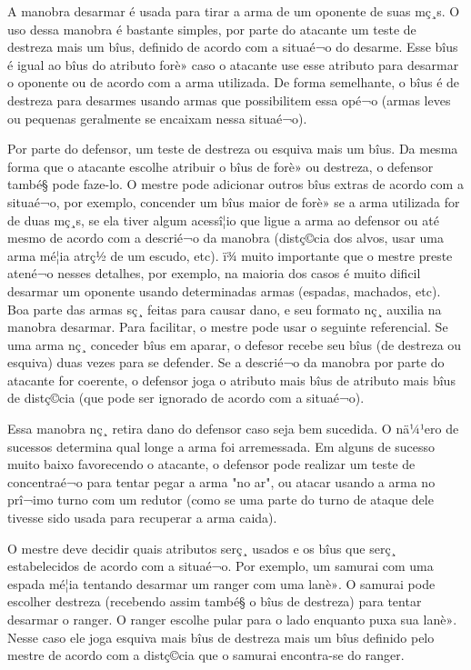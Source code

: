 A manobra desarmar é usada para tirar a arma de um oponente de suas mç¸s. O uso dessa manobra é bastante simples, por parte do atacante um teste de destreza mais um bîus, definido de acordo com a situaé¬o do desarme. Esse bîus é igual ao bîus do atributo forè» caso o atacante use esse atributo para desarmar o oponente ou de acordo com a arma utilizada. De forma semelhante, o bîus é de destreza para desarmes usando armas que possibilitem essa opé¬o (armas leves ou pequenas geralmente se encaixam nessa situaé¬o).

Por parte do defensor, um teste de destreza ou esquiva mais um bîus. Da mesma forma que o atacante escolhe atribuir o bîus de forè» ou destreza, o defensor també§ pode faze-lo. O mestre pode adicionar outros bîus extras de acordo com a situaé¬o, por exemplo, concender um bîus maior de forè» se a arma utilizada for de duas mç¸s, se ela tiver algum acessî¦io que ligue a arma ao defensor ou até mesmo de acordo com a descrié¬o da manobra (distç©cia dos alvos, usar uma arma mé¦ia atrç½ de um escudo, etc). ï¾ muito importante que o mestre preste atené¬o nesses detalhes, por exemplo, na maioria dos casos é muito dificil desarmar um oponente usando determinadas armas (espadas, machados, etc). Boa parte das armas sç¸ feitas para causar dano, e seu formato nç¸ auxilia na manobra desarmar. Para facilitar, o mestre pode usar o seguinte referencial. Se uma arma nç¸ conceder bîus em aparar, o defesor recebe seu bîus (de destreza ou esquiva) duas vezes para se defender. Se a descrié¬o da manobra por parte do atacante for coerente, o defensor joga o atributo mais bîus de atributo mais bîus de distç©cia (que pode ser ignorado de acordo com a situaé¬o).
 
Essa manobra nç¸ retira dano do defensor caso seja bem sucedida. O nä¼¹ero de sucessos determina qual longe a arma foi arremessada. Em alguns de sucesso muito baixo favorecendo o atacante, o defensor pode realizar um teste de concentraé¬o para tentar pegar a arma "no ar", ou atacar usando a arma no prî¬imo turno com um redutor (como se uma parte do turno de ataque dele tivesse sido usada para recuperar a arma caida).

O mestre deve decidir quais atributos serç¸ usados e os bîus que serç¸ estabelecidos de acordo com a situaé¬o. Por exemplo, um samurai com uma espada mé¦ia tentando desarmar um ranger com uma lanè». O samurai pode escolher destreza (recebendo assim també§ o bîus de destreza) para tentar desarmar o ranger. O ranger escolhe pular para o lado enquanto puxa sua lanè». Nesse caso ele joga esquiva mais bîus de destreza mais um bîus definido pelo mestre de acordo com a distç©cia que o samurai encontra-se do ranger.

